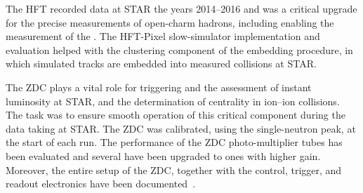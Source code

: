 The HFT recorded data at STAR the years 2014--2016 and was a critical upgrade for the precise measurements of open-charm hadrons, including enabling the measurement of the \Lambdac\@. The HFT-Pixel slow-simulator implementation and evaluation helped with the clustering component of the embedding procedure, in which simulated tracks are embedded into measured collisions at STAR\@. 

The ZDC plays a vital role for triggering and the assessment of instant luminosity at STAR, and the determination of centrality in ion--ion collisions. The task was to ensure smooth operation of this critical component during the data taking at STAR\@. The ZDC was calibrated, using the single-neutron peak, at the start of each run. The performance of the ZDC photo-multiplier tubes has been evaluated and several have been upgraded to ones with higher gain. Moreover, the entire setup of the ZDC, together with the control, trigger, and readout electronics have been documented~\cite{ZDCmanual}\@.



% 
